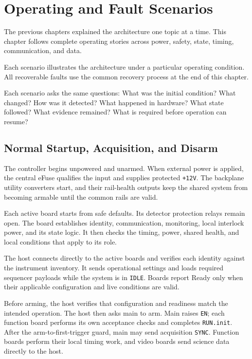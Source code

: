 \chapter{Operating and Fault Scenarios}
\label{chap:scenarios}

The previous chapters explained the architecture one topic at a time. This chapter follows complete operating stories across power, safety, state, timing, communication, and data.

Each scenario illustrates the architecture under a particular operating condition. All recoverable faults use the common recovery process at the end of this chapter.

Each scenario asks the same questions: What was the initial condition? What changed? How was it detected? What happened in hardware? What state followed? What evidence remained? What is required before operation can resume?

\section{Normal Startup, Acquisition, and Disarm}

The controller begins unpowered and unarmed. When external power is applied, the central eFuse qualifies the input and supplies protected \texttt{+12V}. The backplane utility converters start, and their rail-health outputs keep the shared system from becoming armable until the common rails are valid.

Each active board starts from safe defaults. Its detector protection relays remain open. The board establishes identity, communication, monitoring, local interlock power, and its state logic. It then checks the timing, power, shared health, and local conditions that apply to its role.

The host connects directly to the active boards and verifies each identity against the instrument inventory. It sends operational settings and loads required sequencer payloads while the system is in \texttt{IDLE}. Boards report Ready only when their applicable configuration and live conditions are valid.

Before arming, the host verifies that configuration and readiness match the intended operation. The host then asks main to arm. Main raises \texttt{EN}; each function board performs its own acceptance checks and completes \texttt{RUN.init}. After the arm-to-first-trigger guard, main may send acquisition \texttt{SYNC}. Function boards perform their local timing work, and video boards send science data directly to the host.

